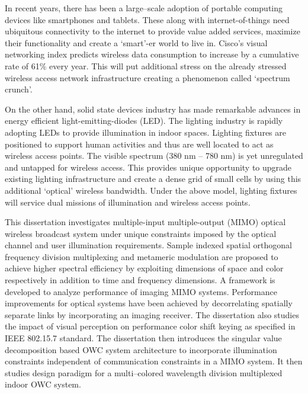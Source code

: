 In recent years, there has been a large--scale adoption of portable computing devices like smartphones and tablets. These along with internet-of-things need ubiquitous connectivity to the internet to provide value added services, maximize their functionality and create a `smart'-er world to live in. Cisco's visual networking index predicts wireless data consumption to increase by a cumulative rate of 61\% every year. This will put additional stress on the already stressed wireless access network infrastructure creating a phenomenon called `spectrum crunch'. 

On the other hand, solid state devices industry has made remarkable advances in energy efficient light-emitting-diodes (LED). The lighting industry is rapidly adopting LEDs to provide illumination in indoor spaces. Lighting fixtures are positioned to support human activities and thus are well located to act as wireless access points. The visible spectrum (380 nm -- 780 nm) is yet unregulated and untapped for wireless access. This provides unique opportunity to upgrade existing lighting infrastructure and create a dense grid of small cells by using this additional `optical' wireless bandwidth. Under the above model, lighting fixtures will service dual missions of illumination and wireless access points. 

This dissertation investigates multiple-input multiple-output (MIMO) optical wireless broadcast system under unique constraints imposed by the optical channel and user illumination requirements. Sample indexed spatial orthogonal frequency division multiplexing and metameric modulation are proposed to achieve higher spectral efficiency by exploiting dimensions of space and color respectively in addition to time and frequency dimensions. A framework is developed to analyze performance of imaging MIMO systems. Performance improvements for optical systems have been achieved by decorrelating spatially separate links by incorporating an imaging receiver. The dissertation also studies the impact of visual perception on performance color shift keying as specified in IEEE 802.15.7 standard. The dissertation then introduces the singular value decomposition based OWC system architecture to incorporate illumination constraints independent of communication constraints in a MIMO system. It then studies design paradigm for a multi--colored wavelength division multiplexed indoor OWC system. 